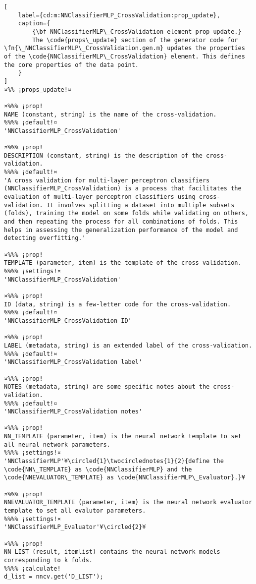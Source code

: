 \documentclass{tufte-handout}
\begin{document}
\begin{lstlisting}[
	label={cd:m:NNClassifierMLP_CrossValidation:prop_update},
	caption={
		{\bf NNClassifierMLP\_CrossValidation element prop update.}
		The \code{props\_update} section of the generator code for \fn{\_NNClassifierMLP\_CrossValidation.gen.m} updates the properties of the \code{NNClassifierMLP\_CrossValidation} element. This defines the core properties of the data point.
	}
]
¤%% ¡props_update!¤

¤%%% ¡prop!
NAME (constant, string) is the name of the cross-validation.
%%%% ¡default!¤
'NNClassifierMLP_CrossValidation'

¤%%% ¡prop!
DESCRIPTION (constant, string) is the description of the cross-validation.
%%%% ¡default!¤
'A cross validation for multi-layer perceptron classifiers (NNClassifierMLP_CrossValidation) is a process that facilitates the evaluation of multi-layer perceptron classifiers using cross-validation. It involves splitting a dataset into multiple subsets (folds), training the model on some folds while validating on others, and then repeating the process for all combinations of folds. This helps in assessing the generalization performance of the model and detecting overfitting.'

¤%%% ¡prop!
TEMPLATE (parameter, item) is the template of the cross-validation.
%%%% ¡settings!¤
'NNClassifierMLP_CrossValidation'

¤%%% ¡prop!
ID (data, string) is a few-letter code for the cross-validation.
%%%% ¡default!¤
'NNClassifierMLP_CrossValidation ID'

¤%%% ¡prop!
LABEL (metadata, string) is an extended label of the cross-validation.
%%%% ¡default!¤
'NNClassifierMLP_CrossValidation label'

¤%%% ¡prop!
NOTES (metadata, string) are some specific notes about the cross-validation.
%%%% ¡default!¤
'NNClassifierMLP_CrossValidation notes'

¤%%% ¡prop!
NN_TEMPLATE (parameter, item) is the neural network template to set all neural network parameters.
%%%% ¡settings!¤
'NNClassifierMLP'¥\circled{1}\twocirclednotes{1}{2}{define the \code{NN\_TEMPLATE} as \code{NNClassifierMLP} and the \code{NNEVALUATOR\_TEMPLATE} as \code{NNClassifierMLP\_Evaluator}.}¥

¤%%% ¡prop!
NNEVALUATOR_TEMPLATE (parameter, item) is the neural network evaluator template to set all evalutor parameters.
%%%% ¡settings!¤
'NNClassifierMLP_Evaluator'¥\circled{2}¥

¤%%% ¡prop!
NN_LIST (result, itemlist) contains the neural network models corresponding to k folds.
%%%% ¡calculate!
d_list = nncv.get('D_LIST');


\end{lstlisting}
\end{document}
